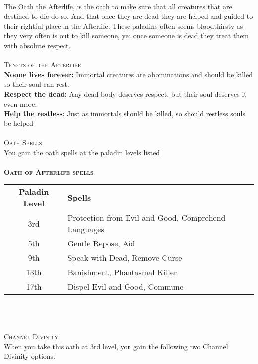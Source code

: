 \documentclass[22pt,a4paper,twocolumn]{article}
\begin{document}
\\
The Oath the Afterlife, is the oath to make sure that all creatures that are destined to die do so. And that once they are dead they are helped and guided to their rightful place in the Afterlife. These paladins often seems bloodthirsty as they very often is out to kill someone, yet once someone is dead they treat them with absolute respect.\\
\\
{\fontsize{18pt}{18pt}\textcolor{title}{\textsc{Tenets of the Afterlife}}}\\
\textbf{Noone lives forever: }Immortal creatures are abominations and should be killed so their soul can rest.\\
\textbf{Respect the dead: }Any dead body deserves respect, but their soul deserves it even more.\\
\textbf{Help the restless: }Just as immortals should be killed, so should restless souls be helped\\
\\
{\fontsize{18pt}{18pt}\textcolor{title}{\textsc{Oath Spells}}}\\
You gain the oath spells at the paladin levels listed\\
\\
{\fontsize{16pt}{16pt}\textsc{\textbf{Oath of Afterlife spells}}}\\
\begin{tabular}{cp{6cm}}
{\bf Paladin Level} & {\bf Spells}                         \\
\rowcolor[HTML]{B8EFAD} 
3rd                 & Protection from Evil and Good, Comprehend Languages  \\
5th                 & Gentle Repose, Aid \\
\rowcolor[HTML]{B8EFAD} 
9th                 & Speak with Dead, Remove Curse \\
13th                & Banishment, Phantasmal Killer  \\
\rowcolor[HTML]{B8EFAD} 
17th                & Dispel Evil and Good, Commune
\end{tabular}\\\\
\\
{\fontsize{18pt}{18pt}\textcolor{title}{\textsc{Channel Divinity}}}\\
When you take this oath at 3rd level, you gain the following two Channel Divinity options.\\
\end{document}
